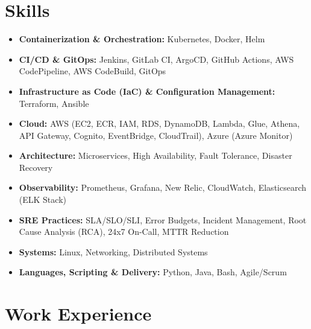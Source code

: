 \documentclass[a4paper,10.999999pt]{article}
\begin{document}
    \section{Skills}
    \begin{itemize}[leftmargin=1.35em, itemsep=0.35pt, topsep=0.3pt, parsep=0pt, label=\raisebox{0.25ex}{\tiny$\circ$}]
    \item \textbf{Containerization \& Orchestration:} Kubernetes, Docker, Helm
    \item \textbf{CI/CD \& GitOps:} Jenkins, GitLab CI, ArgoCD, GitHub Actions, AWS CodePipeline, AWS CodeBuild, GitOps
    \item \textbf{Infrastructure as Code (IaC) \& Configuration Management:} Terraform, Ansible
    \item \textbf{Cloud:} AWS (EC2, ECR, IAM, RDS, DynamoDB, Lambda, Glue, Athena, API Gateway, Cognito, EventBridge, CloudTrail), Azure (Azure Monitor)
    \item \textbf{Architecture:} Microservices, High Availability, Fault Tolerance, Disaster Recovery
    \item \textbf{Observability:} Prometheus, Grafana, New Relic, CloudWatch, Elasticsearch (ELK Stack)
    \item \textbf{SRE Practices:} SLA/SLO/SLI, Error Budgets, Incident Management, Root Cause Analysis (RCA), 24x7 On-Call, MTTR Reduction
    \item \textbf{Systems:} Linux, Networking, Distributed Systems
    \item \textbf{Languages, Scripting \& Delivery:} Python, Java, Bash, Agile/Scrum
    \end{itemize}


    \section{Work Experience}
\end{document}
